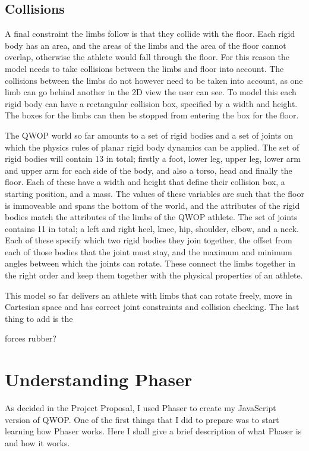 \documentclass[12pt,a4paper,twoside,openright]{report}
\begin{document}
\subsection{Collisions}
\label{sub:collisions}
A final constraint the limbs follow is that they collide with the floor.
Each rigid body has an area, and the areas of the limbs and the area of the floor cannot overlap, otherwise the athlete would fall through the floor.
For this reason the model needs to take collisions between the limbs and floor into account. The collisions between the limbs do not however need to be taken into account, as one limb can go behind another in the 2D view the user can see.
To model this each rigid body can have a rectangular collision box, specified by a width and height. The boxes for the limbs can then be stopped from entering the box for the floor.

The QWOP world so far amounts to a set of rigid bodies and a set of joints on which the physics rules of planar rigid body dynamics can be applied.
The set of rigid bodies will contain 13 in total; firstly a foot, lower leg, upper leg, lower arm and upper arm for each side of the body, and also a torso, head and finally the floor. Each of these have a width and height that define their collision box, a starting position, and a mass.
The values of these variables are such that the floor is immoveable and spans the bottom of the world, and the attributes of the rigid bodies match the attributes of the limbs of the QWOP athlete.
The set of joints contains 11 in total; a left and right heel, knee, hip, shoulder, elbow, and a neck. Each of these specify which two rigid bodies they join together, the offset from each of those bodies that the joint must stay, and the maximum and minimum angles between which the joints can rotate. These connect the limbs together in the right order and keep them together with the physical properties of an athlete.


This model so far delivers an athlete with limbs that can rotate freely, move in Cartesian space and has correct joint constraints and collision checking. The last thing to add is the 

forces
rubber?

\section{Understanding Phaser}
\label{phaser}

As decided in the Project Proposal, I used Phaser to create my JavaScript version of QWOP.
One of the first things that I did to prepare was to start learning how Phaser works.
Here I shall give a brief description of what Phaser is and how it works.
\end{document}
